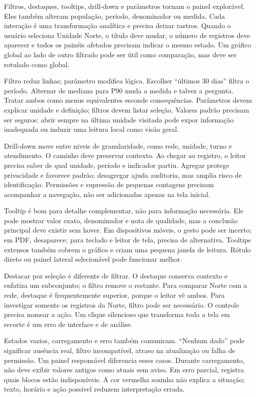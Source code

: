 Filtros, destaques, tooltips, drill-down e parâmetros tornam o painel explorável. Eles também alteram população, período, denominador ou medida. Cada interação é uma transformação analítica e precisa deixar rastros. Quando o usuário seleciona Unidade Norte, o título deve mudar, o número de registros deve aparecer e todos os painéis afetados precisam indicar o mesmo estado. Um gráfico global ao lado de outro filtrado pode ser útil como comparação, mas deve ser rotulado como global.

Filtro reduz linhas; parâmetro modifica lógica. Escolher ``últimos 30 dias'' filtra o período. Alternar de mediana para P90 muda a medida e talvez a pergunta. Tratar ambos como menus equivalentes esconde consequências. Parâmetros devem explicar unidade e definição; filtros devem listar seleção. Valores padrão precisam ser seguros: abrir sempre na última unidade visitada pode expor informação inadequada ou induzir uma leitura local como visão geral.

Drill-down move entre níveis de granularidade, como rede, unidade, turno e atendimento. O caminho deve preservar contexto. Ao chegar ao registro, o leitor precisa saber de qual unidade, período e indicador partiu. Agregar protege privacidade e favorece padrão; desagregar ajuda auditoria, mas amplia risco de identificação. Permissões e supressão de pequenas contagens precisam acompanhar a navegação, não ser adicionadas apenas na tela inicial.

Tooltip é bom para detalhe complementar, não para informação necessária. Ele pode mostrar valor exato, denominador e nota de qualidade, mas a conclusão principal deve existir sem hover. Em dispositivos móveis, o gesto pode ser incerto; em PDF, desaparece; para teclado e leitor de tela, precisa de alternativa. Tooltips extensos também cobrem o gráfico e criam uma pequena janela de leitura. Rótulo direto ou painel lateral selecionável pode funcionar melhor.

Destacar por seleção é diferente de filtrar. O destaque conserva contexto e enfatiza um subconjunto; o filtro remove o restante. Para comparar Norte com a rede, destaque é frequentemente superior, porque o leitor vê ambos. Para investigar somente os registros da Norte, filtro pode ser necessário. O controle precisa nomear a ação. Um clique silencioso que transforma toda a tela em recorte é um erro de interface e de análise.

Estados vazios, carregamento e erro também comunicam. ``Nenhum dado'' pode significar ausência real, filtro incompatível, atraso na atualização ou falha de permissão. Um painel responsável diferencia esses casos. Durante carregamento, não deve exibir valores antigos como atuais sem aviso. Em erro parcial, registra quais blocos estão indisponíveis. A cor vermelha sozinha não explica a situação; texto, horário e ação possível reduzem interpretação errada.

